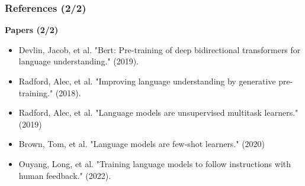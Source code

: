 \documentclass{beamer}
\begin{document}
\begin{frame}
	\frametitle{References (2/2)}
	
	{\footnotesize
		\textbf{Papers (2/2)}
		\begin{itemize}
			\item Devlin, Jacob, et al. "Bert: Pre-training of deep bidirectional transformers for language understanding." (2019).
			\item Radford, Alec, et al. "Improving language understanding by generative pre-training." (2018).
			\item Radford, Alec, et al. "Language models are unsupervised multitask learners." (2019)
			\item Brown, Tom, et al. "Language models are few-shot learners." (2020)
			\item Ouyang, Long, et al. "Training language models to follow instructions with human feedback." (2022).
		\end{itemize}
		
}

\end{frame}	


	
\end{document}

